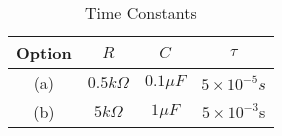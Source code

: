 \begin{table}[!h]
    \centering
    \begin{tabular}{|c|c|c|c|}
    \hline
        \textbf{Option} & $R$ & $C$ & $\tau$\\
    \hline
        (a) & $0.5k\Omega$ & $0.1\mu F$ & $5\times10^
        {-5}s$\\
    \hline
        (b) & $5k\Omega$ & $1\mu F$ & $5\times10^{-3}$s\\
    \hline
    \end{tabular}
    \caption{Time Constants}
    \label{tab:2_gate.ee.ph.37}
\end{table}
